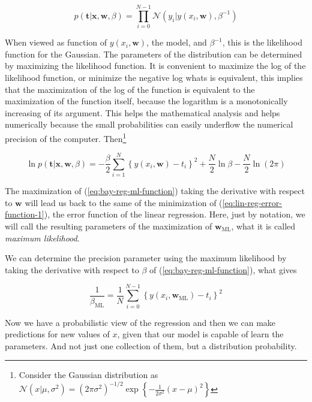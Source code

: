 \documentclass[11pt]{article} %
\begin{document}
\begin{equation}
   p(\mathbf{t} | \mathbf{x}, \mathbf{w}, \beta)= \prod_{i=0}^{N-1} \mathcal{N}\left(y_i | y(x_i, \mathbf{w}), \beta^{-1}\right)
\end{equation}

When viewed as function of $y(x_i, \mathbf{w})$, the model, and $\beta^{-1}$, this is the likelihood function for the Gaussian. The parameters of the distribution can be determined by maximizing the likelihood function. It is convenient to maximize the log of the likelihood function, or minimize the negative log whats is equivalent, this implies that the maximization of the log of the function is equivalent to the maximization of the function itself, because the logarithm is a monotonically increasing of its argument. This helps the mathematical analysis and helps numerically because the small probabilities can easily underflow the numerical precision of the computer. Then\footnote[2]{Consider the Gaussian distribution as $\mathcal{N}\left(x | \mu, \sigma^{2}\right)=\left(2 \pi \sigma^{2}\right)^{-1 / 2} \exp \left\{-\frac{1}{2 \sigma^{2}}(x-\mu)^{2}\right\}$}

\begin{equation}
   \label{eq:bay-reg-ml-function}
   \ln p(\mathbf{t} | \mathbf{x}, \mathbf{w}, \beta)=-\frac{\beta}{2} \sum_{i=1}^{N}\left\{y\left(x_{i}, \mathbf{w}\right)-t_{i}\right\}^{2}+\frac{N}{2} \ln \beta-\frac{N}{2} \ln (2 \pi)
\end{equation}

The maximization of (\ref{eq:bay-reg-ml-function}) taking the derivative with respect to $\mathbf{w}$ will lead us back to 
the same of the minimization of (\ref{eq:lin-reg-error-function-1}), the error function of the linear regression. Here, just by notation, we will call the resulting parameters of the maximization of $\mathbf{w}_{\text{ML}}$, what it is called \textit{maximum likelihood}.

We can determine the precision parameter using the maximum likelihood by taking the derivative with respect to $\beta$ of (\ref{eq:bay-reg-ml-function}), what gives

\begin{equation}
   \frac{1}{\beta_{\mathrm{ML}}}=\frac{1}{N} \sum_{i=0}^{N-1}\left\{y\left(x_{i}, \mathbf{w}_{\mathrm{ML}}\right)-t_{i}\right\}^{2}
\end{equation}

Now we have a probabilistic view of the regression and then we can make predictions for new values of $x$, given that our model is capable of learn the parameters. And not just one collection of them, but a distribution probability.
\end{document}
